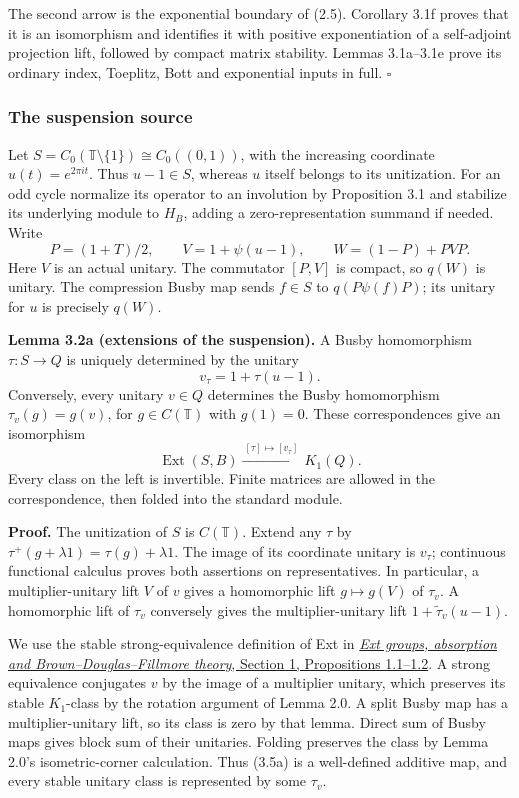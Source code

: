 \documentclass[
  11pt,
]{article}
\begin{document}
The second arrow is the exponential boundary of (2.5). Corollary 3.1f
proves that it is an isomorphism and identifies it with positive
exponentiation of a self-adjoint projection lift, followed by compact
matrix stability. Lemmas 3.1a--3.1e prove its ordinary index, Toeplitz,
Bott and exponential inputs in full. \(\square\)

\subsubsection{The suspension source}\label{the-suspension-source}

Let \(S=C_0(\mathbb T\setminus\{1\})\cong C_0((0,1))\), with the
increasing coordinate \(u(t)=e^{2\pi it}\). Thus \(u-1\in S\), whereas
\(u\) itself belongs to its unitization. For an odd cycle normalize its
operator to an involution by Proposition 3.1 and stabilize its
underlying module to \(H_B\), adding a zero-representation summand if
needed. Write \[
P=(1+T)/2,\qquad
V=1+\psi(u-1),\qquad
W=(1-P)+PVP.
\tag{3.5}
\] Here \(V\) is an actual unitary. The commutator \([P,V]\) is compact,
so \(q(W)\) is unitary. The compression Busby map sends \(f\in S\) to
\(q(P\psi(f)P)\); its unitary for \(u\) is precisely \(q(W)\).

\textbf{Lemma 3.2a (extensions of the suspension).} A Busby homomorphism
\(\tau:S\to Q\) is uniquely determined by the unitary \[
v_\tau=1+\tau(u-1).
\] Conversely, every unitary \(v\in Q\) determines the Busby
homomorphism \(\tau_v(g)=g(v)\), for \(g\in C(\mathbb T)\) with
\(g(1)=0\). These correspondences give an isomorphism \[
\operatorname{Ext}(S,B)\xrightarrow{\ [\tau]\mapsto[v_\tau]\ }K_1(Q).
\tag{3.5a}
\] Every class on the left is invertible. Finite matrices are allowed in
the correspondence, then folded into the standard module.

\textbf{Proof.} The unitization of \(S\) is \(C(\mathbb T)\). Extend any
\(\tau\) by \(\tau^+(g+\lambda1)=\tau(g)+\lambda1\). The image of its
coordinate unitary is \(v_\tau\); continuous functional calculus proves
both assertions on representatives. In particular, a multiplier-unitary
lift \(V\) of \(v\) gives a homomorphic lift \(g\mapsto g(V)\) of
\(\tau_v\). A homomorphic lift of \(\tau_v\) conversely gives the
multiplier-unitary lift \(1+\widetilde\tau_v(u-1)\).

We use the stable strong-equivalence definition of Ext in
\href{KT-KK-02.html\#1-adding-quotient-relations}{\emph{Ext groups,
absorption and Brown--Douglas--Fillmore theory}, Section 1, Propositions
1.1--1.2}. A strong equivalence conjugates \(v\) by the image of a
multiplier unitary, which preserves its stable \(K_1\)-class by the
rotation argument of Lemma 2.0. A split Busby map has a
multiplier-unitary lift, so its class is zero by that lemma. Direct sum
of Busby maps gives block sum of their unitaries. Folding preserves the
class by Lemma 2.0's isometric-corner calculation. Thus (3.5a) is a
well-defined additive map, and every stable unitary class is represented
by some \(\tau_v\).
\end{document}
